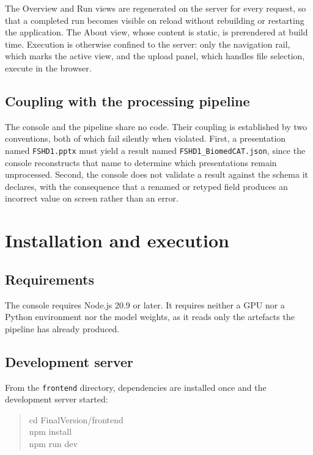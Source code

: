 \documentclass[11pt,a4paper]{article}
\begin{document}
The Overview and Run views are regenerated on the server for every request, so
that a completed run becomes visible on reload without rebuilding or restarting
the application. The About view, whose content is static, is prerendered at build
time. Execution is otherwise confined to the server: only the navigation rail,
which marks the active view, and the upload panel, which handles file selection,
execute in the browser.

\subsection{Coupling with the processing pipeline}

The console and the pipeline share no code. Their coupling is established by two
conventions, both of which fail silently when violated. First, a presentation named
\texttt{FSHD1.pptx} must yield a result named \texttt{FSHD1\_BiomedCAT.json},
since the console reconstructs that name to determine which presentations remain
unprocessed. Second, the console does not validate a result against the schema it
declares, with the consequence that a renamed or retyped field produces an
incorrect value on screen rather than an error.

\section{Installation and execution}

\subsection{Requirements}

The console requires Node.js 20.9 or later. It requires neither a GPU nor a
Python environment nor the model weights, as it reads only the artefacts the
pipeline has already produced.

\subsection{Development server}

From the \texttt{frontend} directory, dependencies are installed once and the
development server started:

\begin{quote}
\ttfamily
cd FinalVersion/frontend \\
npm install \\
npm run dev
\end{quote}
\end{document}
